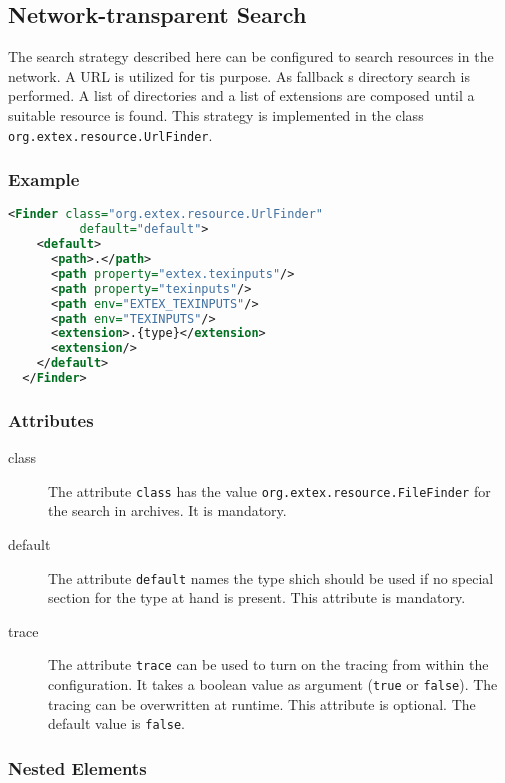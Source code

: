 \subsection{Network-transparent Search}

The search strategy described here can be configured to search
resources in the network. A URL is utilized for tis purpose. As
fallback s directory search is performed. A list of directories and a
list of extensions are composed until a suitable resource is found.
This strategy is implemented in the class
\texttt{org.extex.resource.UrlFinder}.

\subsubsection*{Example}

\begin{lstlisting}[language=XML]
  <Finder class="org.extex.resource.UrlFinder"
          default="default">
    <default>
      <path>.</path>
      <path property="extex.texinputs"/>
      <path property="texinputs"/>
      <path env="EXTEX_TEXINPUTS"/>
      <path env="TEXINPUTS"/>
      <extension>.{type}</extension>
      <extension/>
    </default>
  </Finder>
\end{lstlisting}

\subsubsection*{Attributes}
\begin{description}
\item[class] The attribute \texttt{class} has the value
  \texttt{org.extex.resource.FileFinder} for the search in
  archives. It is mandatory.
\item[default] The attribute \texttt{default} names the type shich
  should be used if no special section for the type at hand is
  present. This attribute is mandatory.
\item[trace] The attribute \texttt{trace} can be used to turn on the
  tracing from within the configuration. It takes a boolean value as
  argument (\texttt{true} or \texttt{false}). The tracing can be
  overwritten at runtime. This attribute is optional. The default
  value is \texttt{false}.
\end{description}

\subsubsection*{Nested Elements}

